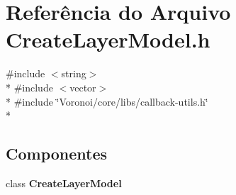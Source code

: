 \section{Referência do Arquivo Create\+Layer\+Model.\+h}
\label{_create_layer_model_8h}
{\ttfamily \#include $<$string$>$}\\*
{\ttfamily \#include $<$vector$>$}\\*
{\ttfamily \#include \char`\"{}Voronoi/core/libs/callback-\/utils.\+h\char`\"{}}\\*
\subsection*{Componentes}
\begin{DoxyCompactItemize}
\item 
class {\bf Create\+Layer\+Model}
\end{DoxyCompactItemize}
